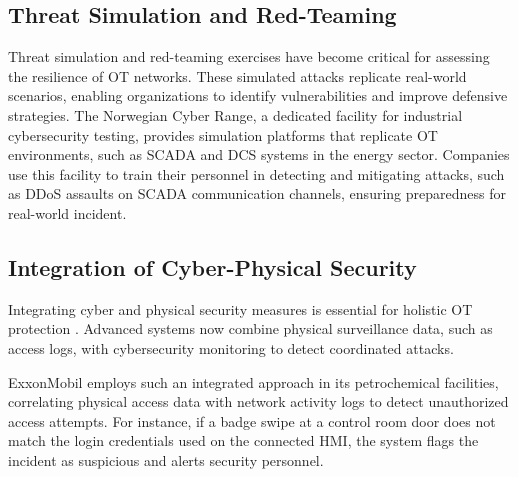 \subsection {Threat Simulation and Red-Teaming}
Threat simulation and red-teaming exercises have become critical for assessing the resilience of OT networks. These simulated attacks replicate real-world scenarios, enabling organizations to identify vulnerabilities and improve defensive strategies.
The Norwegian Cyber Range, a dedicated facility for industrial cybersecurity testing, provides simulation platforms that replicate OT environments, such as SCADA and DCS systems in the energy sector. Companies use this facility to train their personnel in detecting and mitigating attacks, such as DDoS assaults on SCADA communication channels, ensuring preparedness for real-world incident.

\subsection {Integration of Cyber-Physical Security}
Integrating cyber and physical security measures is essential for holistic OT protection \cite{kure2018integrated}. Advanced systems now combine physical surveillance data, such as access logs, with cybersecurity monitoring to detect coordinated attacks.

ExxonMobil employs such an integrated approach in its petrochemical facilities, correlating physical access data with network activity logs to detect unauthorized access attempts. For instance, if a badge swipe at a control room door does not match the login credentials used on the connected HMI, the system flags the incident as suspicious and alerts security personnel.

